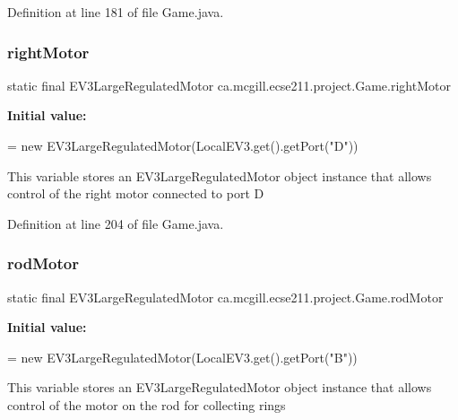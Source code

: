 Definition at line 181 of file Game.\+java.

\mbox{\label{enumca_1_1mcgill_1_1ecse211_1_1project_1_1_game_a7a05fcf37c4435c32270776a427ba0d2}} 
\subsubsection{\texorpdfstring{right\+Motor}{rightMotor}}
{\footnotesize\ttfamily  static  final E\+V3\+Large\+Regulated\+Motor ca.\+mcgill.\+ecse211.\+project.\+Game.\+right\+Motor\hspace{0.3cm}{\ttfamily [static]}}

{\bfseries Initial value\+:}
\begin{DoxyCode}
=
      \textcolor{keyword}{new} EV3LargeRegulatedMotor(LocalEV3.get().getPort(\textcolor{stringliteral}{"D"}))
\end{DoxyCode}
This variable stores an E\+V3\+Large\+Regulated\+Motor object instance that allows control of the right motor connected to port D 

Definition at line 204 of file Game.\+java.

\mbox{\label{enumca_1_1mcgill_1_1ecse211_1_1project_1_1_game_abc070af2fa5a5cda6d81977b35aacfb4}} 
\subsubsection{\texorpdfstring{rod\+Motor}{rodMotor}}
{\footnotesize\ttfamily  static  final E\+V3\+Large\+Regulated\+Motor ca.\+mcgill.\+ecse211.\+project.\+Game.\+rod\+Motor\hspace{0.3cm}{\ttfamily [static]}}

{\bfseries Initial value\+:}
\begin{DoxyCode}
=
      \textcolor{keyword}{new} EV3LargeRegulatedMotor(LocalEV3.get().getPort(\textcolor{stringliteral}{"B"}))
\end{DoxyCode}
This variable stores an E\+V3\+Large\+Regulated\+Motor object instance that allows control of the motor on the rod for collecting rings 

